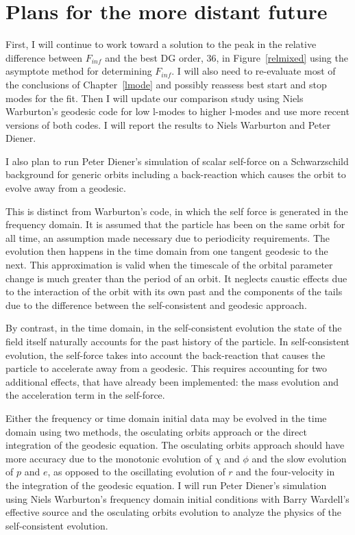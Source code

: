 \section{Plans for the more distant future}
First, I will continue to work toward a solution to the peak in the relative difference between $F_{inf}$ and the best DG order, 36, in Figure~\ref{relmixed} using the asymptote method for determining $F_{inf}$. I will also need to re-evaluate most of the conclusions of Chapter~\ref{lmode} and possibly reassess best start and stop modes for the fit. Then I will update our comparison study using Niels Warburton's geodesic code for low l-modes to higher l-modes and use more recent versions of both codes. I will report the results to Niels Warburton and Peter Diener. 

I also plan to run Peter Diener's simulation of scalar self-force on a Schwarzschild background for generic orbits including a back-reaction which causes the orbit to evolve away from a geodesic.

This is distinct from Warburton's code, in which the self force is generated in the frequency domain. It is assumed that the particle has been on the same orbit for all time, an assumption made necessary due to periodicity requirements. The evolution then happens in the time domain from one tangent geodesic to the next. This approximation is valid when the timescale of the orbital parameter change is much greater than the period of an orbit. It neglects caustic effects due to the interaction of the orbit with its own past and the components of the tails due to the difference between the self-consistent and geodesic approach. 

By contrast, in the time domain, in the self-consistent evolution the state of the field itself naturally accounts for the past history of the particle. In self-consistent evolution, the self-force takes into account the back-reaction that causes the particle to accelerate away from a geodesic. This requires accounting for two additional effects, that have already been implemented: the mass evolution and the acceleration term in the self-force. 


Either the frequency or time domain initial data may be evolved in the time domain using two methods, the osculating orbits approach or the direct integration of the geodesic equation. The osculating orbits approach should have more accuracy due to the monotonic evolution of $\chi$ and $\phi$ and the slow evolution of $p$ and $e$, as opposed to the oscillating evolution of $r$ and the four-velocity in the integration of the geodesic equation. I will run Peter Diener's simulation using Niels Warburton's frequency domain initial conditions with Barry Wardell's effective source and the osculating orbits evolution to analyze the physics of the self-consistent evolution. 


